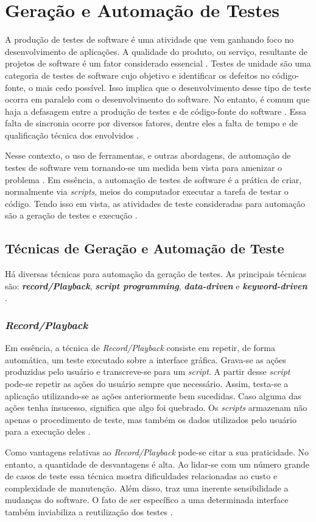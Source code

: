 \section{Geração e Automação de Testes}
A produção de testes de software é uma atividade que vem ganhando foco no desenvolvimento de aplicações. A qualidade do produto, ou serviço, resultante de projetos de software é um fator considerado essencial \cite{barbosaEtAl2009}. Testes de unidade são uma categoria de testes de software cujo objetivo e identificar os defeitos no código-fonte, o mais cedo possível. Isso implica que o desenvolvimento desse tipo de teste ocorra em paralelo com o desenvolvimento do software. No entanto, é comum que haja a defasagem entre a produção de testes e de código-fonte do software \cite{fantinatoEtAl2004}. Essa falta de sincronia ocorre por diversos fatores, dentre eles a falta de tempo e de qualificação técnica dos envolvidos \cite{fantinatoEtAl2004}.
\par
\indent Nesse contexto, o uso de ferramentas, e outras abordagens, de automação de testes de software vem tornando-se um medida bem vista para amenizar o problema \cite{fantinatoEtAl2004}. Em essência, a automação de testes de software é a prática de criar, normalmente via \textit{scripts}, meios do computador executar a tarefa de testar o código. Tendo isso em vista, as atividades de teste consideradas para automação são a geração de testes e execução \cite{fantinatoEtAl2004}.

\subsection{Técnicas de Geração e Automação de Teste}
Há diversas técnicas para automação da geração de testes. As principais técnicas são: \textbf{\textit{record/Playback}}, \textbf{\textit{script programming}}, \textbf{\textit{data-driven}} e \textbf{\textit{keyword-driven}} \cite{fantinatoEtAl2004}.
\subsubsection{\textit{Record/Playback}}
Em essência, a técnica de \textit{Record/Playback} consiste em repetir, de forma automática, um teste executado sobre a interface gráfica. Grava-se as ações produzidas pelo usuário e transcreve-se para um \textit{script}. A partir desse \textit{script} pode-se repetir as ações do usuário sempre que necessário. Assim, testa-se a aplicação utilizando-se as ações anteriormente bem sucedidas. Caso alguma das ações tenha insucesso, significa que algo foi quebrado. Os \textit{scripts} armazenam não apenas o procedimento de teste, mas também os dados utilizados pelo usuário para a execução deles \cite{kent2007}.
\par
\indent Como vantagens relativas ao \textit{Record/Playback} pode-se citar a sua praticidade. No entanto, a quantidade de desvantagens é alta. Ao lidar-se com um número grande de casos de teste essa técnica mostra dificuldades relacionadas ao custo e complexidade de manutenção. Além disso, traz uma inerente sensibilidade a mudanças do software. O fato de ser específico a uma determinada interface também inviabiliza a reutilização dos testes \cite{fantinatoEtAl2004}.
